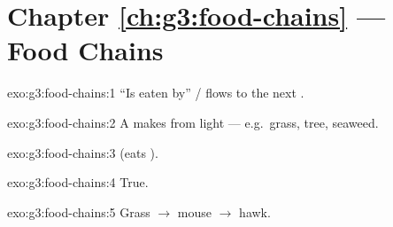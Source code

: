 \section*{Chapter \ref{ch:g3:food-chains} --- Food Chains}

\begin{solution}{exo:g3:food-chains:1}
``Is eaten by'' /  flows to the next .
\end{solution}

\begin{solution}{exo:g3:food-chains:2}
A  makes  from light --- e.g.\ grass, tree, seaweed.
\end{solution}

\begin{solution}{exo:g3:food-chains:3}
 (eats ).
\end{solution}

\begin{solution}{exo:g3:food-chains:4}
True.
\end{solution}

\begin{solution}{exo:g3:food-chains:5}
Grass $\to$ mouse $\to$ hawk.
\end{solution}

